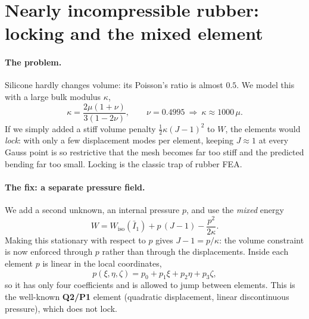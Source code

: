\documentclass[11pt,a4paper]{article}
\numberwithin{equation}{section}
\newcommand{\Ib}{\bar I_1}
\begin{document}
\section{Nearly incompressible rubber: locking and the mixed element}
\label{sec:locking}

\paragraph{The problem.}
Silicone hardly changes volume: its Poisson's ratio is almost $0.5$. We model this
with a large bulk modulus $\kappa$,
\begin{equation}
\kappa=\frac{2\mu(1+\nu)}{3(1-2\nu)},\qquad \nu=0.4995\ \Rightarrow\ \kappa\approx1000\,\mu .
\end{equation}
If we simply added a stiff volume penalty $\tfrac12\kappa(J-1)^2$ to $W$, the
elements would \emph{lock}: with only a few displacement modes per element, keeping
$J\approx1$ at every Gauss point is so restrictive that the mesh becomes far too
stiff and the predicted bending far too small. Locking is the classic trap of
rubber FEA.

\paragraph{The fix: a separate pressure field.}
We add a second unknown, an internal pressure $p$, and use the \emph{mixed} energy
\begin{equation}
W=W_{\text{iso}}(\Ib)+p\,(J-1)-\frac{p^2}{2\kappa}.
\label{eq:mixed}
\end{equation}
Making this stationary with respect to $p$ gives $J-1=p/\kappa$: the volume
constraint is now enforced through $p$ rather than through the displacements. Inside
each element $p$ is linear in the local coordinates,
\begin{equation}
p(\xi,\eta,\zeta)=p_0+p_1\xi+p_2\eta+p_3\zeta ,
\end{equation}
so it has only four coefficients and is allowed to jump between elements. This is
the well-known \textbf{Q2/P1} element (quadratic displacement, linear discontinuous
pressure), which does not lock.
\end{document}
